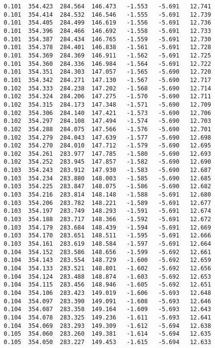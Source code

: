 \begin{verbatim}
   0.101  354.423  284.564  146.473   -1.553   -5.691   12.741
   0.101  354.414  284.532  146.546   -1.555   -5.691   12.739
   0.101  354.405  284.499  146.619   -1.556   -5.691   12.736
   0.101  354.396  284.466  146.692   -1.558   -5.691   12.733
   0.101  354.387  284.434  146.765   -1.559   -5.691   12.730
   0.101  354.378  284.401  146.838   -1.561   -5.691   12.728
   0.101  354.369  284.369  146.911   -1.562   -5.691   12.725
   0.101  354.360  284.336  146.984   -1.564   -5.691   12.722
   0.101  354.351  284.303  147.057   -1.565   -5.690   12.720
   0.101  354.342  284.271  147.130   -1.567   -5.690   12.717
   0.102  354.333  284.238  147.202   -1.568   -5.690   12.714
   0.102  354.324  284.206  147.275   -1.570   -5.690   12.711
   0.102  354.315  284.173  147.348   -1.571   -5.690   12.709
   0.102  354.306  284.140  147.421   -1.573   -5.690   12.706
   0.102  354.297  284.108  147.494   -1.574   -5.690   12.703
   0.102  354.288  284.075  147.566   -1.576   -5.690   12.701
   0.102  354.279  284.043  147.639   -1.577   -5.690   12.698
   0.102  354.270  284.010  147.712   -1.579   -5.690   12.695
   0.102  354.261  283.977  147.785   -1.580   -5.690   12.693
   0.102  354.252  283.945  147.857   -1.582   -5.690   12.690
   0.103  354.243  283.912  147.930   -1.583   -5.690   12.687
   0.103  354.234  283.880  148.003   -1.585   -5.690   12.685
   0.103  354.225  283.847  148.075   -1.586   -5.690   12.682
   0.103  354.216  283.814  148.148   -1.588   -5.691   12.680
   0.103  354.206  283.782  148.221   -1.589   -5.691   12.677
   0.103  354.197  283.749  148.293   -1.591   -5.691   12.674
   0.103  354.188  283.717  148.366   -1.592   -5.691   12.672
   0.103  354.179  283.684  148.439   -1.594   -5.691   12.669
   0.103  354.170  283.651  148.511   -1.595   -5.691   12.666
   0.103  354.161  283.619  148.584   -1.597   -5.691   12.664
   0.104  354.152  283.586  148.656   -1.599   -5.692   12.661
   0.104  354.143  283.554  148.729   -1.600   -5.692   12.659
   0.104  354.133  283.521  148.801   -1.602   -5.692   12.656
   0.104  354.124  283.488  148.874   -1.603   -5.692   12.653
   0.104  354.115  283.456  148.946   -1.605   -5.692   12.651
   0.104  354.106  283.423  149.019   -1.606   -5.693   12.648
   0.104  354.097  283.390  149.091   -1.608   -5.693   12.646
   0.104  354.087  283.358  149.164   -1.609   -5.693   12.643
   0.104  354.078  283.325  149.236   -1.611   -5.693   12.641
   0.104  354.069  283.293  149.309   -1.612   -5.694   12.638
   0.105  354.060  283.260  149.381   -1.614   -5.694   12.635
   0.105  354.050  283.227  149.453   -1.615   -5.694   12.633

\end{verbatim}
